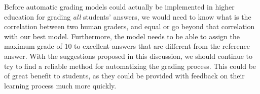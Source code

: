 \documentclass[a4paper,10pt,twoside]{article}
\begin{document}
Before automatic grading models could actually be implemented in higher education for grading \textit{all} students' answers, we would need to know what is the correlation between two human graders, and equal or go beyond that correlation with our best model. Furthermore, the model needs to be able to assign the maximum grade of 10 to excellent answers that are different from the reference answer. With the suggestions proposed in this discussion, we should continue to try to find a reliable method for automatizing the grading process. This could be of great benefit to students, as they could be provided with feedback on their learning process much more quickly.


 
 
\end{document}
